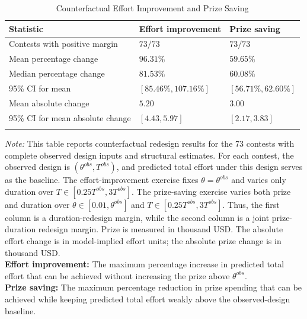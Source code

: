 \documentclass[mnsc]{informs3}
\begin{document}
\begin{table}[htbp]
\centering
\caption{Counterfactual Effort Improvement and Prize Saving}
\label{tab-counterfactual-policy}
\begin{tabularx}{\textwidth}{lYY}
\toprule
\textbf{Statistic} & \textbf{Effort improvement} & \textbf{Prize saving} \\
\midrule
Contests with positive margin & $73/73$ & $73/73$ \\
Mean percentage change & $96.31\%$ & $59.65\%$ \\
Median percentage change & $81.53\%$ & $60.08\%$ \\
95\% CI for mean & $[85.46\%,107.16\%]$ & $[56.71\%,62.60\%]$ \\
Mean absolute change & $5.20$ & $3.00$ \\
95\% CI for mean absolute change & $[4.43,5.97]$ & $[2.17,3.83]$ \\
\bottomrule
\addlinespace[0.5ex]
\end{tabularx}
\begin{minipage}{\textwidth}
{\footnotesize
\textit{Note:}
This table reports counterfactual redesign results for the 73 contests with complete observed design inputs and structural estimates.
For each contest, the observed design is $(\theta^{obs},T^{obs})$, and predicted total effort under this design serves as the baseline.
The effort-improvement exercise fixes $\theta=\theta^{obs}$ and varies only duration over $T\in[0.25T^{obs},3T^{obs}]$.
The prize-saving exercise varies both prize and duration over $\theta\in[0.01,\theta^{obs}]$ and $T\in[0.25T^{obs},3T^{obs}]$.
Thus, the first column is a duration-redesign margin, while the second column is a joint prize-duration redesign margin.
Prize is measured in thousand USD. The absolute effort change is in model-implied effort units; the absolute prize change is in thousand USD.
\\
\textbf{Effort improvement:} The maximum percentage increase in predicted total effort that can be achieved without increasing the prize above $\theta^{obs}$.
\\
\textbf{Prize saving:} The maximum percentage reduction in prize spending that can be achieved while keeping predicted total effort weakly above the observed-design baseline.
}
\end{minipage}
\end{table}
\end{document}
